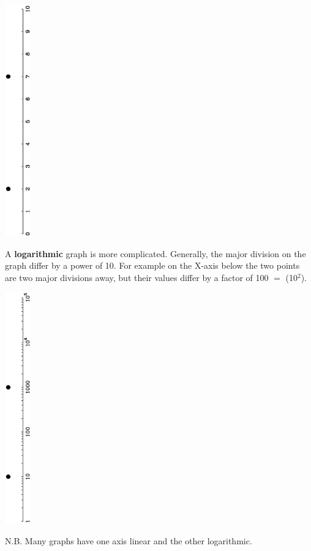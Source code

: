 \begin{center}
\mbox{\includegraphics[height=10cm,angle=-90]{./images/Graph1.ps}}
\end{center}


A {\bf logarithmic} graph is more complicated.  Generally, the major
division on the graph differ by a power of 10.  For example on the
X-axis below the two points are two major divisions away, but their
values differ by a factor of 100 $=$ (10$^2$).

\begin{center}
\mbox{\includegraphics[height=10cm,angle=-90]{./images/Graph2.ps}}
\end{center}

{N.B.} Many graphs have one axis linear and the other logarithmic.
\\

